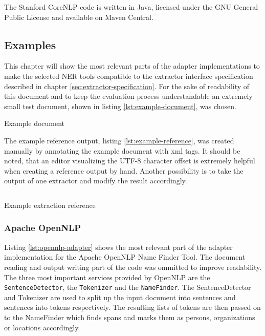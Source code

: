 The Stanford CoreNLP code is written in Java, licensed under the GNU General Public License and available on Maven Central.

\newpage
\subsection{Examples}
This chapter will show the most relevant parts of the adapter implementations to make the selected \gls{NER} tools compatible to the extractor interface specification described in chapter \ref{sec:extractor-specification}. For the sake of readability of this document and to keep the evaluation process understandable an extremely small test document, shown in listing \ref{lst:example-document}, was chosen.

\begin{listing}[H]
\texttt{}
\caption{Example document}
\label{lst:example-document}
\end{listing}

The example reference output, listing \ref{lst:example-reference}, was created manually by annotating the example document with xml tags. It should be noted, that an editor visualizing the UTF-8 character offset is extremely helpful when creating a reference output by hand. Another possibility is to take the output of one extractor and modify the result accordingly.

\begin{listing}[H]
\inputminted{xml}{reference.xml}
\caption{Example extraction reference}
\label{lst:example-reference}
\end{listing}

\newpage
\subsubsection{Apache OpenNLP}
Listing \ref{lst:opennlp-adapter} shows the most relevant part of the adapter implementation for the Apache OpenNLP Name Finder Tool. The document reading and output writing part of the code was ommitted to improve readability. The three most important services provided by OpenNLP are the \texttt{SentenceDetector}, the \texttt{Tokenizer} and the \texttt{NameFinder}. The SentenceDetector and Tokenizer are used to split up the input document into sentences and sentences into tokens respectively. The resulting lists of tokens are then passed on to the NameFinder which finds spans and marks them as persons, organizations or locations accordingly.

